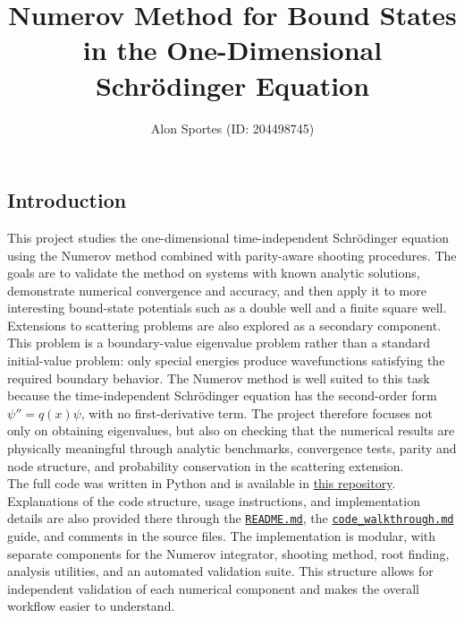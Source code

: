 \documentclass[11pt]{article}
\title{\textbf{Numerov Method for Bound States in the One-Dimensional Schr\"odinger Equation}}
\author{Alon Sportes (ID: 204498745)}
\date{}
\begin{document}
    \maketitle

    \vfill

    \begingroup
        \setlength{\parskip}{0pt}
        \tableofcontents
    \endgroup
    \vfill

    \begin{refsection}

    \newpage

    \section{Introduction}
        This project studies the one-dimensional time-independent Schr\"odinger equation using the Numerov method combined with parity-aware shooting procedures. The goals are to validate the method on systems with known analytic solutions, demonstrate numerical convergence and accuracy, and then apply it to more interesting bound-state potentials such as a double well and a finite square well. Extensions to scattering problems are also explored as a secondary component. \\

        This problem is a boundary-value eigenvalue problem rather than a standard initial-value problem: only special energies produce wavefunctions satisfying the required boundary behavior. The Numerov method is well suited to this task because the time-independent Schr\"odinger equation has the second-order form $\psi''=q(x)\psi$, with no first-derivative term. The project therefore focuses not only on obtaining eigenvalues, but also on checking that the numerical results are physically meaningful through analytic benchmarks, convergence tests, parity and node structure, and probability conservation in the scattering extension. \\
        
        The full code was written in Python and is available in \href{https://github.com/alons126/Numerov-bound-states}{this repository}. Explanations of the code structure, usage instructions, and implementation details are also provided there through the \href{https://github.com/alons126/Numerov-bound-states/blob/main/README.md}{\texttt{README.md}}, the \href{https://github.com/alons126/Numerov-bound-states/blob/main/docs/code_walkthrough.md}{\texttt{code\_walkthrough.md}} guide, and comments in the source files. The implementation is modular, with separate components for the Numerov integrator, shooting method, root finding, analysis utilities, and an automated validation suite. This structure allows for independent validation of each numerical component and makes the overall workflow easier to understand.


\end{refsection}
\end{document}

